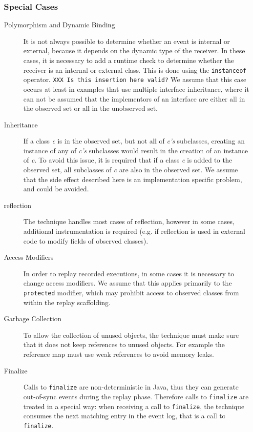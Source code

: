 \subsubsection{Special Cases}
\begin{description}
 \item [Polymorphism and Dynamic Binding] It is not always possible to determine whether an event is internal or external, because it depends on the dynamic type of the receiver. In these cases, it is necessary to add a runtime check to determine whether the receiver is an internal or external class. This is done using the \texttt{instanceof} operator. \texttt{XXX Is this insertion here valid?} We assume that this case occurs at least in examples that use multiple interface inheritance, where it can not be assumed that the implementors of an interface are either all in the observed set or all in the unobserved set.
 \item [Inheritance] If a class \emph{c} is in the observed set, but not all of \emph{c's} subclasses, creating an instance of any of \emph{c's} subclasses would result in the creation of an instance of \emph{c}. To avoid this issue, it is required that if a class \emph{c} is added to the observed set, all subclasses of \emph{c} are also in the observed set. We assume that the side effect described here is an implementation specific problem, and could be avoided.
 \item [reflection] The technique handles most cases of reflection, however in some cases, additional instrumentation is required (e.g. if reflection is used in external code to modify fields of observed classes). 
 \item [Access Modifiers] In order to replay recorded executions, in some cases it is necessary to change access modifiers. We assume that this applies primarily to the \texttt{protected} modifier, which may prohibit access to observed classes from within the replay scaffolding.
 \item [Garbage Collection] To allow the collection of unused objects, the technique must make sure that it does not keep references to unused objects. For example the reference map must use weak references to avoid memory leaks.
 \item [Finalize] Calls to \texttt{finalize} are non-deterministic in Java, thus they can generate out-of-sync events during the replay phase. Therefore calls to \texttt{finalize} are treated in a special way: when receiving a call to \texttt{finalize}, the technique consumes the next matching entry in the event log, that is a call to \texttt{finalize}.
\end{description}

